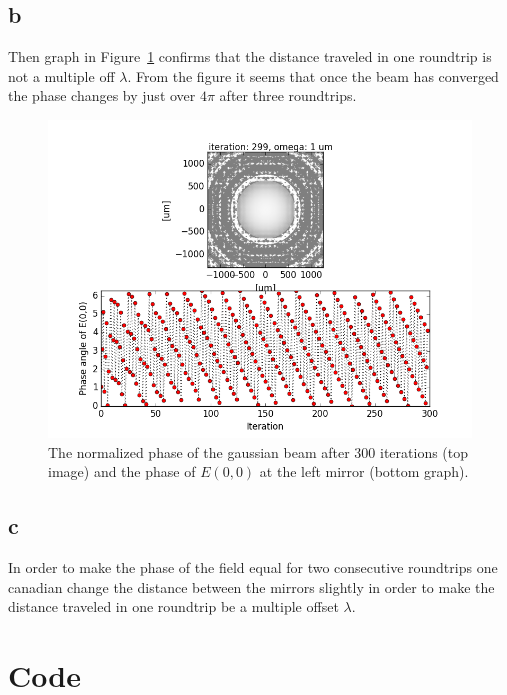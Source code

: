 \documentclass[12pt,a4paper]{article}
\begin{document}
\subsection{b}
Then graph in Figure~\ref{fig:task7b} confirms that the distance traveled in one roundtrip is not a multiple off $\lambda$. From the figure it seems that once the beam has converged the phase changes by just over $4\pi$ after three roundtrips.
\begin{figure}[ht!]
  \centering
  \includegraphics[width=\textwidth]{7b_gauss_0_0.png}
  \caption{The normalized phase of the gaussian beam after 300 iterations (top image) and the phase of $E(0,0)$ at the left mirror (bottom graph).}
  \label{fig:task7b}
\end{figure}

\subsection{c}
In order to make the phase of the field equal for two consecutive roundtrips one canadian change the distance between the mirrors slightly in order to make the distance traveled in one roundtrip be a multiple offset $\lambda$.
\newpage
\appendix
\section{Code}
\begin{changemargin}{-3cm}{0.5cm}

\end{changemargin}
\end{document}
